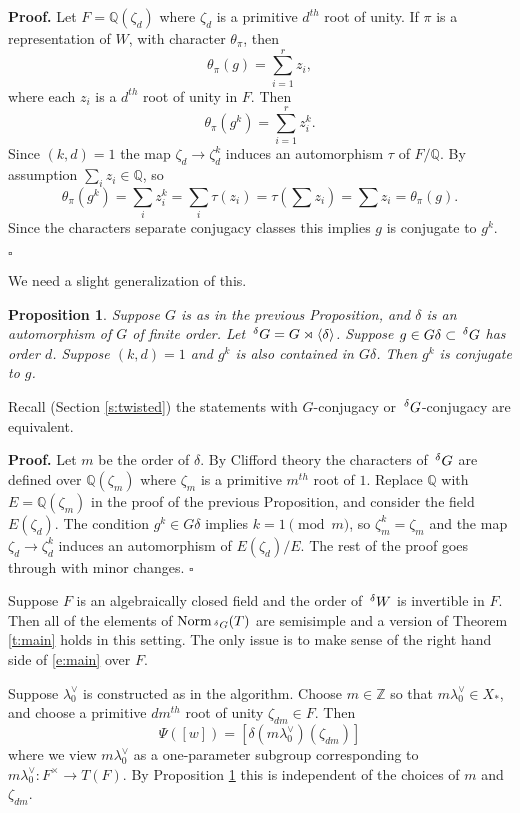 \documentclass[10pt,leqno]{article}
\newtheorem{proposition}[equation]{Proposition}
\newcommand{\qed}{\hfill $\square$ \medskip}
\newenvironment{proof}[1][Proof]{\noindent\textbf{#1.} }{\qed}
\newcommand{\Norm}{\text{Norm}}
\newcommand{\Z}{\mathbb Z}
\newcommand{\Q}{\mathbb Q}
\newcommand{\ch}[1]{#1^\vee}
\newcommand{\Wext}{\negthinspace\negthinspace\phantom{a}^\delta W}
\newcommand{\Gext}{\negthinspace\negthinspace\phantom{a}^\delta G}
\begin{document}
\medskip

\begin{proof}
Let $F=\Q(\zeta_d)$ where $\zeta_d$ is a primitive $d^{th}$ root of unity.
If $\pi$ is a representation of $W$, with character $\theta_\pi$, then
$$
\theta_\pi(g)=\sum_{i=1}^r z_i,
$$
where each $z_i$ is a $d^{th}$ root of unity in $F$. Then
$$
\theta_\pi(g^k)=\sum_{i=1}^r z_i^k.
$$
Since $(k,d)=1$ the map $\zeta_d\rightarrow \zeta_d^k$ induces an automorphism $\tau$ of
$F/\Q$. By assumption  $\sum_i z_i\in \Q$, so
$$
\theta_\pi(g^k)=\sum_i z_i^k=\sum_i \tau(z_i)=\tau(\sum z_i)=\sum z_i=\theta_\pi(g).
$$
Since the characters separate conjugacy classes this implies $g$ is conjugate to $g^k$.

\end{proof}

We need a slight generalization of this.

\begin{proposition}
  \label{p:g^k}
Suppose $G$ is as in the previous Proposition, and  $\delta$
is an automorphism of $G$ of finite order. 
Let $\Gext=G\rtimes\langle\delta\rangle$. Suppose
$g\in G\delta\subset \Gext$ has order $d$.
Suppose $(k,d)=1$ and $g^k$ is also contained in $G\delta$. 
Then $g^k$ is conjugate to $g$.
\end{proposition}

Recall (Section \ref{s:twisted}) the statements with $G$-conjugacy or
$\Gext$-conjugacy are equivalent.

\begin{proof}
  Let $m$ be the order of $\delta$. By Clifford theory the characters of $\Gext$ are defined over
  $\Q(\zeta_m)$ where $\zeta_m$ is a primitive $m^{th}$ root of $1$.
  Replace $\Q$ with $E=\Q(\zeta_m)$ in the proof of the previous
  Proposition, and consider the field $E(\zeta_d)$. 
  The condition $g^k\in G\delta$ implies $k=1\pmod m$, so $\zeta_m^k=\zeta_m$ and 
  the map $\zeta_d\rightarrow \zeta_d^k$ induces an automorphism of $E(\zeta_d)/E$.
The  rest of the proof goes through with minor changes.
\end{proof}

\begin{remarkplain}
\label{r:otherfield}
Suppose $F$ is an algebraically closed field and the order of $\Wext$ is invertible in $F$.
Then all of the elements of $\Norm_{\Gext}(T)$ are semisimple
and a version of Theorem \ref{t:main} holds in this setting. The only issue is to make
sense of the right hand side of \eqref{e:main} over $F$. 

Suppose $\ch\lambda_0$ is constructed as in the algorithm. Choose $m\in\Z$ so that $m\ch\lambda_0\in X_*$,
and choose a primitive $dm^{th}$ root of unity $\zeta_{dm}\in F$. Then
$$
\Psi([w])=[\delta (m\ch\lambda_0)(\zeta_{dm})]
$$
where we view $m\ch\lambda_0$ as a one-parameter subgroup
corresponding to $m\ch\lambda_0:F^\times\rightarrow T(F)$. By
Proposition \ref{p:g^k} this is independent of the choices of $m$ and
$\zeta_{dm}$.

\end{remarkplain}
\end{document}
